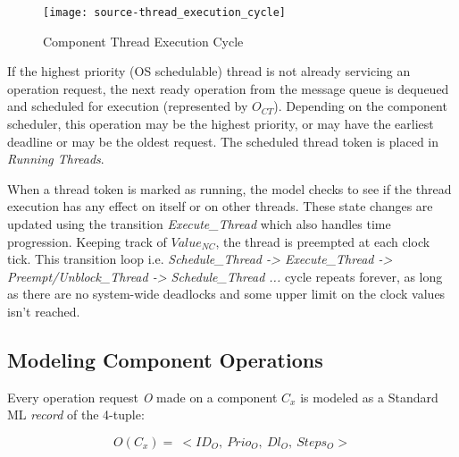 
\begin{figure}[htb]
	\centering
	\texttt{[image: source-thread\_execution\_cycle]}
	\caption{Component Thread Execution Cycle}
	\label{fig:Thread_Execution}
\end{figure}

If the highest priority (OS schedulable) thread is not already servicing an operation request, the next ready operation from the message queue is dequeued and scheduled for execution (represented by $O_{CT}$). Depending on the component scheduler, this operation may be the highest priority, or may have the earliest deadline or may be the oldest request. The scheduled thread token is placed in \emph{Running Threads}. %

When a thread token is marked as running, the model checks to see if the thread execution has any effect on itself or on other threads. These state changes are updated using the transition \emph{Execute\_Thread} which also handles time progression. Keeping track of $Value_{NC}$, the thread is preempted at each clock tick. This transition loop i.e. \emph{Schedule\_Thread -> Execute\_Thread -> Preempt/Unblock\_Thread -> Schedule\_Thread ...} cycle repeats forever, as long as there are no system-wide deadlocks and some upper limit on the clock values isn't reached.

\subsection{Modeling Component Operations}
\label{sec:Modeling_Component_Operations}
Every operation request \emph{O} made on a component \emph{$C_x$} is modeled as a Standard ML \emph{record} of the 4-tuple:

\begin{equation}
O(C_x) = \ < ID_O, \ Prio_O, \ Dl_O, \  Steps_O >
\end{equation}

